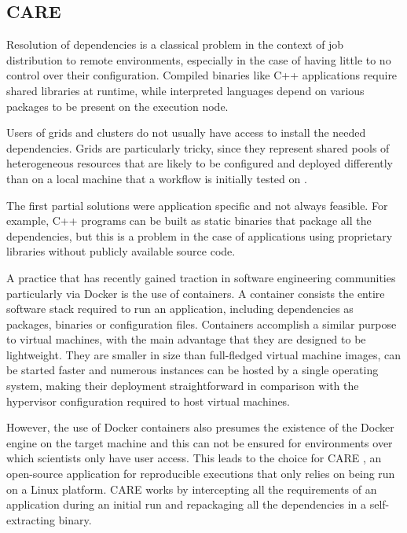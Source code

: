 \subsection{CARE} \label{CARESection}

Resolution of dependencies is a classical problem in the context of job distribution to remote environments, especially in the case of having little to no control over their configuration. Compiled binaries like C++ applications require shared libraries at runtime, while interpreted languages depend on various packages to be present on the execution node. 

Users of grids and clusters do not usually have access to install the needed dependencies. Grids are particularly tricky, since they represent shared pools of heterogeneous resources that are likely to be configured and deployed differently than on a local machine that a workflow is initially tested on \cite{Leclaire2016}.

The first partial solutions were application specific and not always feasible. For example, C++ programs can be built as static binaries that package all the dependencies, but this is a problem in the case of applications using proprietary libraries without publicly available source code.

A practice that has recently gained traction in software engineering communities particularly via Docker \cite{Docker} is the use of containers. A container consists the entire software stack required to run an application, including dependencies as packages, binaries or configuration files. Containers accomplish a similar purpose to virtual machines, with the main advantage that they are designed to be lightweight. They are smaller in size than full-fledged virtual machine images, can be started faster and numerous instances can be hosted by a single operating system, making their deployment straightforward in comparison with the hypervisor configuration required to host virtual machines.

However, the use of Docker containers also presumes the existence of the Docker engine on the target machine and this can not be ensured for environments over which scientists only have user access. This leads to the choice for CARE \cite{Janin2014}, an open-source application for reproducible executions that only relies on being run on a Linux platform. CARE works by intercepting all the requirements of an application during an initial run and repackaging all the dependencies in a self-extracting binary. 

